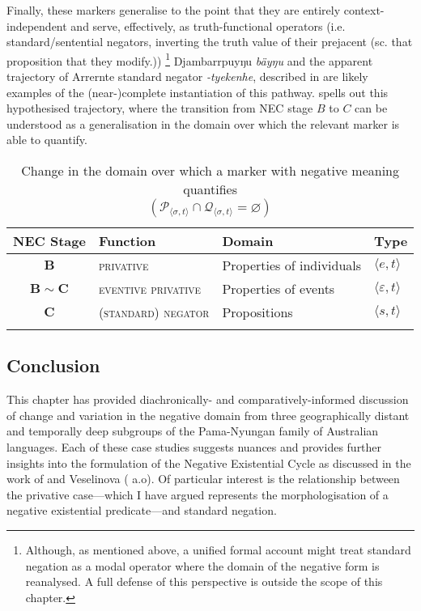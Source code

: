 \documentclass[output=paper]{langsci/langscibook}
\begin{document}
Finally, these markers generalise to the point that they are entirely
    context-independent and serve, effectively, as truth-functional
    operators (i.e. standard\slash sentential negators, inverting the truth
    value of their prejacent (sc. that proposition that they modify.))%
%
\footnote{Although, as mentioned above, a unified formal account might treat standard negation as a modal operator where the domain of the negative form is reanalysed. A full defense of this perspective is outside the scope of this chapter.} 
Djambarrpuyŋu \textit{bäyŋu} and the apparent trajectory of Arrernte
    standard negator \textit{-tyekenhe}, described in 
    are likely examples of the (near-)complete instantiation of this
    pathway.  spells out this hypothesised trajectory, where the transition from NEC stage $ B $ to $ C $ can be understood as a generalisation in the domain over which the relevant marker is able to quantify.

\begin{table}[h]\centering
	\caption{Change in the domain over which a marker with negative meaning quantifies\\$(\mathcal P_{\langle\sigma,t\rangle}\cap\mathcal Q_{\langle\sigma,t\rangle}=\varnothing )$}\label{tab:austr-domain-change}\centering
\begin{tabular}{clll}
\lsptoprule
\textbf{NEC Stage} &	\textbf{Function} & \textbf{Domain} &
    \textbf{Type}\\\midrule
$ \boldsymbol{B} $ &	\textsc{privative}	& Properties of individuals&$ \langle e,t\rangle $\\
 $ \boldsymbol{B\!\sim\!C} $&	\textsc{eventive privative}& Properties of events&$ \langle\varepsilon,t\rangle $ \\
 $ \boldsymbol{C} $ &	\textsc{(standard) negator}& Propositions & $
    \langle s,t\rangle $\\\lspbottomrule
\end{tabular}
\end{table}

\subsection{Conclusion}

This chapter has provided diachronically- and comparatively-informed discussion of change and variation in the negative domain from three geographically distant and temporally deep subgroups of the Pama-Nyungan family of Australian languages. Each of these case studies suggests nuances and provides further insights into the formulation of the Negative Existential Cycle as discussed in the work of \citet{Croft1991} and Veselinova (\citeyear{Veselinova2016} a.o). Of particular interest is the relationship between the privative case---which I have argued represents the morphologisation of a negative existential predicate---and standard negation.
\end{document}

